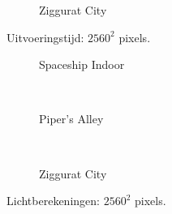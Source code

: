 \begin{figure}[t]
\begin{minipage}[t]{0.5\textwidth}
  \begin{adjustbox}{minipage=\textwidth, scale=0.55}
    \begin{subfigure}[b]{1.6\textwidth}
      \centering
      \def\svgwidth{\textwidth}
      
      \caption{Ziggurat City}
      \label{fig:hs-ns-frame-high:exec:city}
    \end{subfigure}
  \end{adjustbox}
  \caption{\small Uitvoeringstijd: $2560^2$ pixels.}
  \label{fig:hs-ns-frame-high:exec}
  \end{minipage}%
  \begin{minipage}[t]{0.5\textwidth}
  \begin{adjustbox}{minipage=\textwidth, scale=0.55}
    \begin{subfigure}[b]{1.6\textwidth}
      \centering
      \def\svgwidth{\textwidth}
      
      \caption{Spaceship Indoor}
      \vspace{4pt}
      \label{fig:hs-ns-frame-high:lc:indoor}
    \end{subfigure}
  \end{adjustbox} \\
  \begin{adjustbox}{minipage=\textwidth, scale=0.55}
    \begin{subfigure}[b]{1.6\textwidth}
      \centering
      \def\svgwidth{\textwidth}
      
      \caption{Piper's Alley}
      \vspace{4pt}
      \label{fig:hs-ns-frame-high:lc:alley}
    \end{subfigure}
  \end{adjustbox} \\
  \begin{adjustbox}{minipage=\textwidth, scale=0.55}
    \begin{subfigure}[b]{1.6\textwidth}
      \centering
      \def\svgwidth{\textwidth}
      
      \caption{Ziggurat City}
      \label{fig:hs-ns-frame-high:lc:city}
    \end{subfigure}
  \end{adjustbox}
  \caption{\small Lichtberekeningen: $2560^2$ pixels.}
  \label{fig:hs-ns-frame-high:lc}
  \end{minipage} 
\end{figure}

